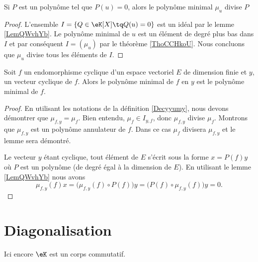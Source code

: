 \begin{proposition}     \label{PropAnnncEcCxj}
    Si \( P\) est un polynôme tel que \( P(u)=0\), alors le polynôme minimal \( \mu_u\) divise \( P\)
\end{proposition}

\begin{proof}
    L'ensemble \( I=\{ Q\in \eK[X]\tq Q(u)=0 \}\) est un idéal par le lemme \ref{LemQWvhYb}. Le polynôme minimal de \( u\) est un élément de degré plus bas dans \( I\) et par conséquent \( I=(\mu_u)\) par le théorème \ref{ThoCCHkoU}. Nous concluons que \( \mu_u\) divise tous les éléments de \( I\).
\end{proof}

\begin{lemma}
    Soit \( f\) un endomorphisme cyclique d'un espace vectoriel \( E\) de dimension finie et \( y\), un vecteur cyclique de \( f\). Alors le polynôme minimal de \( f\) en \( y\) est le polynôme minimal de \( f\).
\end{lemma}

\begin{proof}
    En utilisant les notations de la définition \ref{Decyyumy}, nous devons démontrer que \( \mu_{f,y}=\mu_f\). Bien entendu, \( \mu_f\in I_{y,f}\), donc \( \mu_{f,y}\) divise \( \mu_f\). Montrons que \( \mu_{f,y}\) est un polynôme annulateur de \( f\). Dans ce cas \( \mu_f\) divisera \( \mu_{f,y}\) et le lemme sera démontré.

    Le vecteur \( y\) étant cyclique, tout élément de \( E\) s'écrit sous la forme \( x=P(f)y\) où \( P\) est un polynôme (de degré égal à la dimension de \( E\)). En utilisant le lemme \ref{LemQWvhYb} nous avons
    \begin{equation}
            \mu_{f,y}(f)x=\big( \mu_{f,y}(f)\circ P(f) \big)y
            =\big( P(f)\circ \mu_{f,y}(f) \big)y
            =0.
    \end{equation}
\end{proof}

\section{Diagonalisation}

Ici encore \( \eK\) est un corps commutatif.

